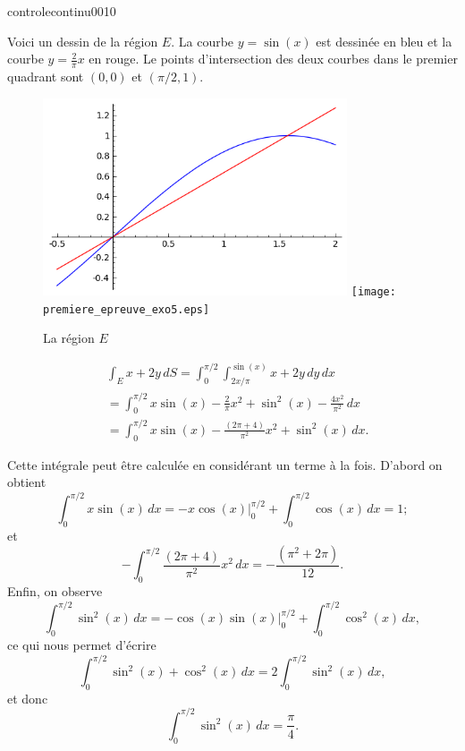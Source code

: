 \begin{corrige}{controlecontinu0010}

Voici un dessin de la région $E$.  La courbe $y=\sin(x)$ est dessinée en bleu et la courbe  $y=\frac{2}{\pi}x$ en rouge. Le points d'intersection des deux courbes dans le premier quadrant sont $(0,0)$  et $(\pi/2, 1)$. 
\begin{figure}
  \begin{center}
        \ifpdf
            \includegraphics[width=9cm]{premiere_epreuve_exo5.png}
        \else
            \texttt{[image: premiere\_epreuve\_exo5.eps]}
        \fi

  \caption{La région $E$}
  \end{center}
 \end{figure}
 
\begin{equation}
  \begin{aligned}
    &\int_{E}x+2y \, dS=\int_0^{\pi/2}\int_{2x/\pi}^{\sin(x)} x+2y\, dy\,dx\\
    &=\int_0^{\pi/2}x\sin(x)-\frac{2}{\pi}x^2+\sin^2(x)-\frac{4x^2}{\pi^2}\,dx\\
    &=\int_0^{\pi/2}x\sin(x)-\frac{(2\pi+ 4)}{\pi^2}x^2+\sin^2(x)\,dx.
  \end{aligned}
\end{equation}

Cette intégrale peut être calculée en considérant un terme à la fois. D'abord on obtient
\[
\int_0^{\pi/2}x\sin(x)\,dx=\left.-x\cos(x)\right\vert_{0}^{\pi/2}+\int_0^{\pi/2}\cos(x)\,dx=1 ;
\]
et
\[
-\int_0^{\pi/2}\frac{(2\pi+ 4)}{\pi^2}x^2 \,dx=-\frac{(\pi^2+ 2\pi)}{12}.
\]
Enfin, on observe 
\[
\int_0^{\pi/2}\sin^2(x)\,dx=\left. -\cos(x)\sin(x)\right\vert_{0}^{\pi/2}+ \int_0^{\pi/2}\cos^2(x)\,dx,
\]
ce qui nous permet d'écrire
 \[
\int_0^{\pi/2}\sin^2(x)+\cos^2(x) \,dx=2 \int_0^{\pi/2}\sin^2(x)\,dx,
\]
et donc
\[
\int_0^{\pi/2}\sin^2(x)\,dx=\frac{\pi}{4}.
\]
\end{corrige}
